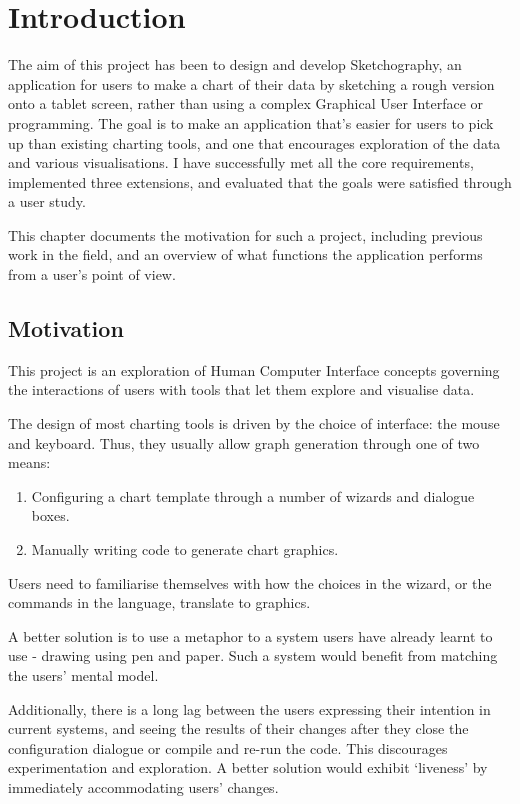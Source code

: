 \chapter{Introduction}
\label{cha:introduction}
The aim of this project has been to design and develop Sketchography, an application for users to make a chart of their data by sketching a rough version onto a tablet screen, rather than using a complex Graphical User Interface or programming. The goal is to make an application that's easier for users to pick up than existing charting tools, and one that encourages exploration of the data and various visualisations. I have successfully met all the core requirements, implemented three extensions, and evaluated that the goals were satisfied through a user study.

This chapter documents the motivation for such a project, including previous work in the field, and an overview of what functions the application performs from a user's point of view.

\section{Motivation}
This project is an exploration of Human Computer Interface concepts governing the interactions of users with tools that let them explore and visualise data.

The design of most charting tools is driven by the choice of interface: the mouse and keyboard. Thus, they usually allow graph generation through one of two means:
\begin{enumerate}
\item Configuring a chart template through a number of wizards and dialogue boxes.
\item Manually writing code to generate chart graphics.
\end{enumerate}

Users need to familiarise themselves with how the choices in the wizard, or the commands in the language, translate to graphics.

A better solution is to use a metaphor to a system users have already learnt to use - drawing using pen and paper. Such a system would benefit from matching the users' mental model. 

Additionally, there is a long lag between the users expressing their intention in current systems, and seeing the results of their changes after they close the configuration dialogue or compile and re-run the code. This discourages experimentation and exploration. A better solution would exhibit `liveness' by immediately accommodating users' changes.

